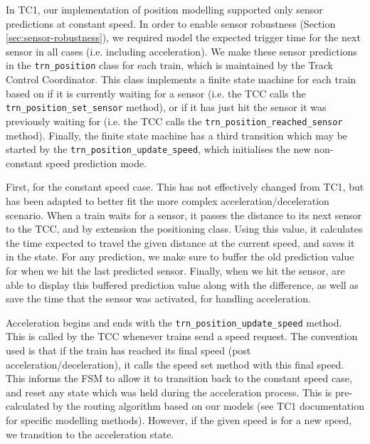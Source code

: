 \documentclass[12pt, titlepage]{article}
\begin{document}
    In TC1, our implementation of position modelling supported only sensor predictions at constant speed. In order to enable sensor robustness (Section \ref{sec:sensor-robustness}), we required model the expected trigger time for the next sensor in all cases (i.e. including acceleration). We make these sensor predictions in the \verb`trn_position` class for each train, which is maintained by the Track Control Coordinator. This class implements a finite state machine for each train based on if it is currently waiting for a sensor (i.e. the TCC calls the \verb`trn_position_set_sensor` method), or if it has just hit the sensor it was previously waiting for (i.e. the TCC calls the \verb`trn_position_reached_sensor` method). Finally, the finite state machine has a third transition which may be started by the \verb`trn_position_update_speed`, which initialises the new non-constant speed prediction mode.
    
    First, for the constant speed case. This has not effectively changed from TC1, but has been adapted to better fit the more complex acceleration/deceleration scenario. When a train waits for a sensor, it passes the distance to its next sensor to the TCC, and by extension the positioning class. Using this value, it calculates the time expected to travel the given distance at the current speed, and saves it in the state. For any prediction, we make sure to buffer the old prediction value for when we hit the last predicted sensor. Finally, when we hit the sensor, are able to display this buffered prediction value along with the difference, as well as save the time that the sensor was activated, for handling acceleration.
    
    Acceleration begins and ends with the \verb`trn_position_update_speed` method. This is called by the TCC whenever trains send a speed request. The convention used is that if the train has reached its final speed (post acceleration/deceleration), it calls the speed set method with this final speed. This informs the FSM to allow it to transition back to the constant speed case, and reset any state which was held during the acceleration process. This is pre-calculated by the routing algorithm based on our models (see TC1 documentation for specific modelling methods). However, if the given speed is for a new speed, we transition to the acceleration state.
    
\end{document}
